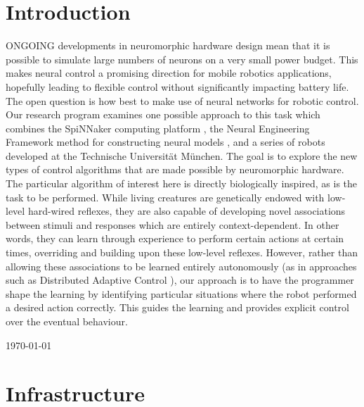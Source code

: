 \documentclass[conference]{IEEEtran}
\begin{document}
\IEEEpeerreviewmaketitle


\section{Introduction}

ONGOING developments in neuromorphic hardware design mean that it is possible to simulate large numbers of neurons on a very small power budget. This makes neural control a promising direction for mobile robotics applications, hopefully leading to flexible control without significantly impacting battery life. The open question is how best to make use of neural networks for robotic control. Our research program examines one possible approach to this task which combines the SpiNNaker computing platform \cite{furber2007neural, furber2014spinnaker}, the Neural Engineering Framework method for constructing neural models \cite{eliasmith2004neural}, and a series of robots developed at the Technische Universit{\"a}t M{\"u}nchen. The goal is to explore the new types of control algorithms that are made possible by neuromorphic hardware. The particular algorithm of interest here is directly biologically inspired, as is the task to be performed. While living creatures are genetically endowed with low-level hard-wired reflexes, they are also capable of developing novel associations between stimuli and responses which are entirely context-dependent. In other words, they can learn through experience to perform certain actions at certain times, overriding and building upon these low-level reflexes. However, rather than allowing these associations to be learned entirely autonomously (as in approaches such as Distributed Adaptive Control \cite{verschure2012distributed}), our approach is to have the programmer shape the learning by identifying particular situations where the robot performed a desired action correctly. This guides the learning and provides explicit control over the eventual behaviour. 

 
\hfill \today

\section{Infrastructure}
\end{document}
